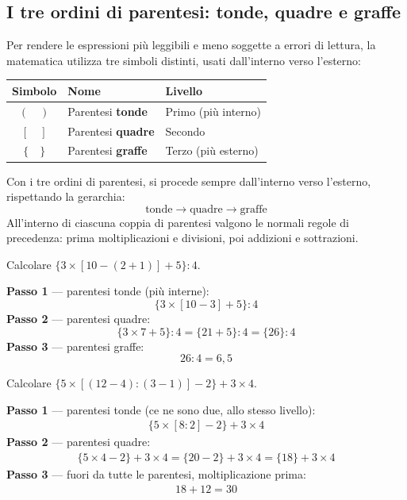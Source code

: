 \subsection{I tre ordini di parentesi: tonde, quadre e graffe}

Per rendere le espressioni più leggibili e meno soggette a errori di lettura,
la matematica utilizza tre simboli distinti, usati dall'interno verso l'esterno:

\begin{center}
    \begin{tabular}{cll}
        \toprule
        \textbf{Simbolo} & \textbf{Nome}             & \textbf{Livello}    \\
        \midrule
        $(\quad)$        & Parentesi \textbf{tonde}  & Primo (più interno) \\
        $[\quad]$        & Parentesi \textbf{quadre} & Secondo             \\
        $\{\quad\}$      & Parentesi \textbf{graffe} & Terzo (più esterno) \\
        \bottomrule
    \end{tabular}
\end{center}

\begin{regola}
    Con i tre ordini di parentesi, si procede sempre dall'interno verso
    l'esterno, rispettando la gerarchia:
    \[
        \text{tonde} \longrightarrow \text{quadre} \longrightarrow \text{graffe}
    \]
    All'interno di ciascuna coppia di parentesi valgono le normali regole
    di precedenza: prima moltiplicazioni e divisioni, poi addizioni e sottrazioni.
\end{regola}

\begin{esempio}
    Calcolare $\{3 \times [10 - (2 + 1)] + 5\} : 4$.

    \textbf{Passo 1} — parentesi tonde (più interne):
    \[
        \{3 \times [10 - 3] + 5\} : 4
    \]
    \textbf{Passo 2} — parentesi quadre:
    \[
        \{3 \times 7 + 5\} : 4
        = \{21 + 5\} : 4
        = \{26\} : 4
    \]
    \textbf{Passo 3} — parentesi graffe:
    \[
        26 : 4 = 6{,}5
    \]
\end{esempio}

\begin{esempio}
    Calcolare $\{5 \times [(12 - 4) : (3 - 1)] - 2\} + 3 \times 4$.

    \textbf{Passo 1} — parentesi tonde (ce ne sono due, allo stesso livello):
    \begin{align*}
        \{5 \times [8 : 2] - 2\} + 3 \times 4
    \end{align*}
    \textbf{Passo 2} — parentesi quadre:
    \begin{align*}
        \{5 \times 4 - 2\} + 3 \times 4
        = \{20 - 2\} + 3 \times 4
        = \{18\} + 3 \times 4
    \end{align*}
    \textbf{Passo 3} — fuori da tutte le parentesi, moltiplicazione prima:
    \begin{align*}
        18 + 12 = 30
    \end{align*}
\end{esempio}

